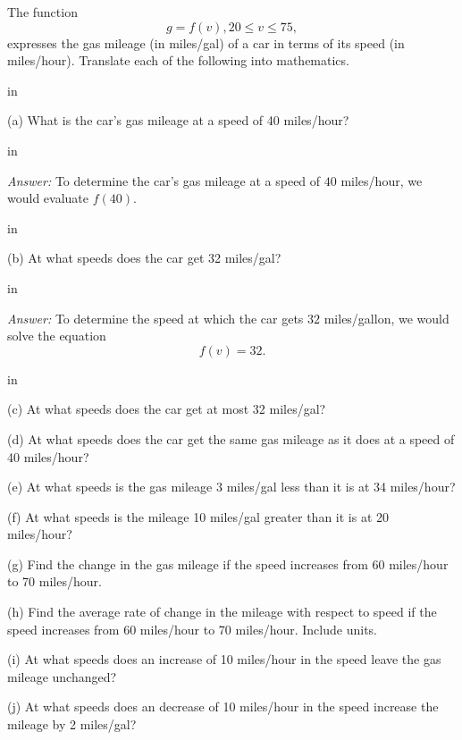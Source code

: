 \documentclass{ximera}
\newcommand{\pskip}{\vskip 0.1 in}
\begin{document}
\begin{example}  \label{ExFun1}

The function
\[
   g = f(v) , 20 \leq v \leq 75 ,
\]
expresses the gas mileage (in miles/gal) of a car in terms of its speed (in miles/hour). Translate each of the following into mathematics.

\pskip


\noindent (a) What is the car's gas mileage at a speed of 40 miles/hour?

\pskip

\emph{Answer:} To determine the car's gas mileage at a speed of $40$ miles/hour, we would evaluate $f(40)$.

\pskip

\noindent (b) At what speeds does the car get 32 miles/gal?

\pskip

\emph{Answer:} To determine the speed at which the car gets $32$ miles/gallon, we would solve the equation
\[
    f(v) = 32 .
\]

\pskip

\noindent (c) At what speeds does the car get at most 32 miles/gal?





\noindent (d) At what speeds does the car get the same gas mileage as it does at a speed of 40 miles/hour?




\noindent (e) At what speeds is the gas mileage $3$ miles/gal less than it is at 34 miles/hour?




\noindent (f) At what speeds is the mileage 10 miles/gal greater than it is at 20 miles/hour?

\noindent (g) Find the change in the gas mileage if the speed increases from 60 miles/hour to 70 miles/hour.

\noindent (h) Find the average rate of change in the mileage with respect to speed if the speed increases from 60 miles/hour to 70 miles/hour. Include units.

\noindent (i) At what speeds does an increase of 10 miles/hour in the speed leave the gas mileage unchanged?

\noindent (j) At what speeds does an decrease of 10 miles/hour in the speed increase the mileage by 2 miles/gal?

\end{example}
\end{document}
